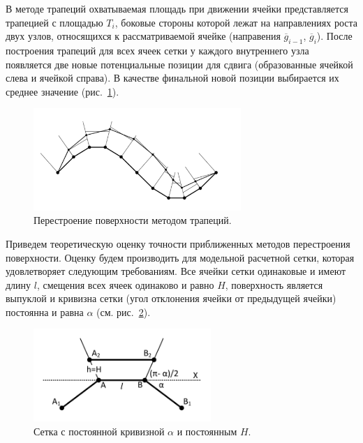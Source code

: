 В методе трапеций охватываемая площадь при движении ячейки представляется трапецией с площадью $T_i$, боковые стороны которой лежат на направлениях роста двух узлов, относящихся к рассматриваемой ячейке (направения $\overline{g}_{i - 1}$, $\overline{g}_i$).
После построения трапеций для всех ячеек сетки у каждого внутреннего узла появляется две новые потенциальные позиции для сдвига (образованные ячейкой слева и ячейкой справа).
В качестве финальной новой позиции выбирается их среднее значение (рис.~\ref{fig:text_1_remesh_2d_grid_trapeziums}).

\begin{figure}[h]
\onelinecaptionstrue
\centering
\includegraphics[width=0.7\textwidth]{pics/text_1_remesh_2d/grid_trapeziums.pdf}
\caption{Перестроение поверхности методом трапеций.}
\label{fig:text_1_remesh_2d_grid_trapeziums}
\end{figure}

Приведем теоретическую оценку точности приближенных методов перестроения поверхности.
Оценку будем производить для модельной расчетной сетки, которая удовлетворяет следующим требованиям.
Все ячейки сетки одинаковые и имеют длину $l$, смещения всех ячеек одинаково и равно $H$, поверхность является выпуклой и кривизна сетки (угол отклонения ячейки от предыдущей ячейки) постоянна и равна $\alpha$ (см. рис.~\ref{fig:text_1_remesh_2d_theoretical_rectangles}).

\begin{figure}[h]
\onelinecaptionstrue
\centering
\includegraphics[width=0.6\textwidth]{pics/text_1_remesh_2d/theoretical_rectangles.pdf}
\caption{Сетка с постоянной кривизной $\alpha$ и постоянным $H$.}
\label{fig:text_1_remesh_2d_theoretical_rectangles}
\end{figure}

